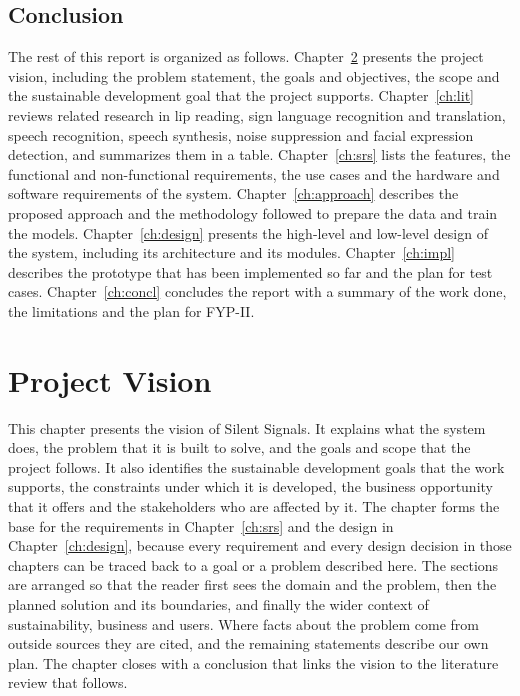 \documentclass{FastFyp}
\begin{document}
\section{Conclusion}
The rest of this report is organized as follows. Chapter~\ref{ch:vision} presents the project vision, including the problem statement, the goals and objectives, the scope and the sustainable development goal that the project supports. Chapter~\ref{ch:lit} reviews related research in lip reading, sign language recognition and translation, speech recognition, speech synthesis, noise suppression and facial expression detection, and summarizes them in a table. Chapter~\ref{ch:srs} lists the features, the functional and non-functional requirements, the use cases and the hardware and software requirements of the system. Chapter~\ref{ch:approach} describes the proposed approach and the methodology followed to prepare the data and train the models. Chapter~\ref{ch:design} presents the high-level and low-level design of the system, including its architecture and its modules.
Chapter~\ref{ch:impl} describes the prototype that has been implemented so far and the plan for test cases. Chapter~\ref{ch:concl} concludes the report with a summary of the work done, the limitations and the plan for FYP-II.

\chapter{Project Vision}
\label{ch:vision}
This chapter presents the vision of Silent Signals. It explains what the system does, the problem that it is built to solve, and the goals and scope that the project follows. It also identifies the sustainable development goals that the work supports, the constraints under which it is developed, the business opportunity that it offers and the stakeholders who are affected by it. The chapter forms the base for the requirements in Chapter~\ref{ch:srs} and the design in Chapter~\ref{ch:design}, because every requirement and every design decision in those chapters can be traced back to a goal or a problem described here. The sections are arranged so that the reader first sees the domain and the problem, then the planned solution and its boundaries, and finally the wider context of sustainability, business and users. Where facts about the problem come from outside sources they are cited, and the remaining statements describe our own plan. The chapter closes with a conclusion that links the vision to the literature review that follows.
\end{document}
